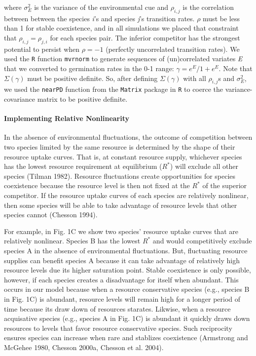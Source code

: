 \documentclass[12pt,]{article}
\begin{document}
\noindent where \(\sigma^2_{E}\) is the variance of the environmental
cue and \(\rho_{i,j}\) is the correlation between between the species
\emph{i}'s and species \emph{j}'s transition rates. \(\rho\) must be
less than 1 for stable coexistence, and in all simulations we placed
that constraint that \(\rho_{i,j} = \rho_{j,i}\) for each species pair.
The inferior competitor has the strongest potential to persist when
\(\rho=-1\) (perfectly uncorrelated transition rates). We used the
\texttt{R} function \texttt{mvrnorm} to generate sequences of
(un)correlated variates \emph{E} that we converted to germination rates
in the 0-1 range: \(\gamma = e^E / 1 + e^E\). Note that
\(\Sigma(\gamma)\) must be positive definite. So, after defining
\(\Sigma(\gamma)\) with all \(\rho_{i,j}\)s and \(\sigma^2_{E}\), we
used the \texttt{nearPD} function from the \texttt{Matrix} package in
\texttt{R} to coerce the variance-covariance matrix to be positive
definite.

\paragraph{Implementing Relative
Nonlinearity}\label{implementing-relative-nonlinearity}

In the absence of environmental fluctuations, the outcome of competition
between two species limited by the same resource is determined by the
shape of their resource uptake curves. That is, at constant resource
supply, whichever species has the lowest resource requirement at
equilibrium (\(R^*\)) will exclude all other species (Tilman 1982).
Resource fluctuations create opportunities for species coexistence
because the resource level is then not fixed at the \(R^*\) of the
superior competitor. If the resource uptake curves of each species are
relatively nonlinear, then some species will be able to take advantage
of resource levels that other species cannot (Chesson 1994).

For example, in Fig. 1C we show two species' resource uptake curves that
are relatively nonlinear. Species B has the lowest \(R^*\) and would
competitively exclude species A in the absence of environmental
fluctuations. But, fluctuating resource supplies can benefit species A
because it can take advantage of relatively high resource levels due its
higher saturation point. Stable coexistence is only possible, however,
if each species creates a disadvantage for itself when abundant. This
occurs in our model because when a resource conservative species (e.g.,
species B in Fig. 1C) is abundant, resource levels will remain high for
a longer period of time because its draw down of resources starates.
Likwise, when a resource acquisative species (e.g., species A in Fig.
1C) is abundant it quickly draws down resources to levels that favor
resource conservative species. Such reciprocity ensures species can
increase when rare and stablizes coexistence (Armstrong and McGehee
1980, Chesson 2000a, Chesson et al. 2004).
\end{document}
